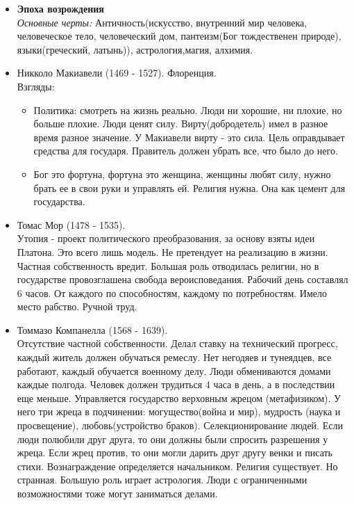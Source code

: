\documentclass[a4paper,12pt]{report} %
\begin{document}
\begin{itemize}
\item \textbf{Эпоха возрождения}
\\ 
\textit{Основные черты: } Античность(искусство, внутренний мир человека, человеческое тело,
человеческий дом, пантеизм(Бог тождественен природе), языки(греческий,
латынь)), астрология,магия, алхимия.
\item Никколо Макиавели (1469 - 1527). Флоренция. \\
Взгляды:
\begin{itemize}
\item Политика: смотреть на жизнь реально. Люди ни хорошие, ни плохие,
  но больше плохие. Люди ценят силу. Вирту(добродетель) имел в разное
  время разное значение. У Макиавели вирту - это сила. Цель
  оправдывает средства для государя. Правитель должен убрать все, что
  было до него.
\item Бог это фортуна, фортуна это женщина, женщины любят силу, нужно
  брать ее в свои руки и управлять ей. Религия нужна. Она как цемент
  для государства.
\end{itemize}
\item Томас Мор (1478 - 1535). \\
Утопия - проект политического преобразования, за основу взяты идеи
Платона. Это всего лишь модель. Не претендует на реализацию в
жизни. Частная собственность вредит. Большая роль отводилась религии,
но в государстве провозглашена свобода вероисповедания. Рабочий день
составлял 6 часов. От каждого по способностям, каждому по
потребностям. Имело место рабство. Ручной труд.
\item Томмазо Компанелла (1568 - 1639). \\
Отсутствие частной собственности. Делал ставку на технический
прогресс, каждый житель должен обучаться ремеслу. Нет негодяев и
тунеядцев, все работают, каждый обучается военному делу. Люди
обмениваются домами каждые полгода. Человек должен трудиться 4 часа в
день, а в последствии еще меньше. Управляется государство верховным
жрецом (метафизиком). У него три жреца в подчинении: могущество(война и мир), мудрость (наука и
просвещение), любовь(устройство браков). Селекционирование людей. Если
люди полюбили друг друга, то они должны были спросить разрешения у
жреца. Если жрец против, то они могли дарить друг другу венки и писать
стихи. Вознаграждение определяется начальником. Религия существует. Но
странная. Большую роль играет астрология. Люди с ограниченными
возможностями тоже могут заниматься делами.\\

\end{itemize}
\end{document}
